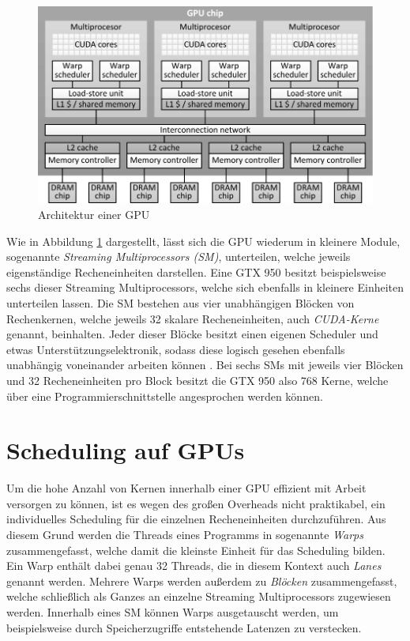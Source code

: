 \begin{figure}[]
	\includegraphics[]{bilder/gpu_architecture.pdf}
	\caption{Architektur einer GPU \cite{Volkov2016}}
	\label{gpu_architecture}
\end{figure}

Wie in Abbildung \ref{gpu_architecture} dargestellt, lässt sich die GPU wiederum in kleinere Module, sogenannte \emph{Streaming Multiprocessors (SM)}, unterteilen, welche jeweils eigenständige Recheneinheiten darstellen.
Eine GTX 950 besitzt beispielsweise sechs dieser Streaming Multiprocessors, welche sich ebenfalls in kleinere Einheiten unterteilen lassen.
Die SM bestehen aus vier unabhängigen Blöcken von Rechenkernen, welche jeweils 32 skalare Recheneinheiten, auch \emph{CUDA-Kerne} genannt, beinhalten.
Jeder dieser Blöcke besitzt einen eigenen Scheduler und etwas Unterstützungselektronik, sodass diese logisch gesehen ebenfalls unabhängig voneinander arbeiten können \cite{Nvidia2014}.
Bei sechs SMs mit jeweils vier Blöcken und 32 Recheneinheiten pro Block besitzt die GTX 950 also 768 Kerne, welche über eine Programmierschnittstelle angesprochen werden können.

\section{Scheduling auf GPUs}
\label{sec:cuda_scheduling}

Um die hohe Anzahl von Kernen innerhalb einer GPU effizient mit Arbeit versorgen zu können, ist es wegen des großen Overheads nicht praktikabel, ein individuelles Scheduling für die einzelnen Recheneinheiten durchzuführen.
Aus diesem Grund werden die Threads eines Programms in sogenannte \emph{Warps} zusammengefasst, welche damit die kleinste Einheit für das Scheduling bilden.
Ein Warp enthält dabei genau 32 Threads, die in diesem Kontext auch \emph{Lanes} genannt werden.
Mehrere Warps werden außerdem zu \emph{Blöcken} zusammengefasst, welche schließlich als Ganzes an einzelne Streaming Multiprocessors zugewiesen werden.
Innerhalb eines SM können Warps ausgetauscht werden, um beispielsweise durch Speicherzugriffe entstehende Latenzen zu verstecken.

